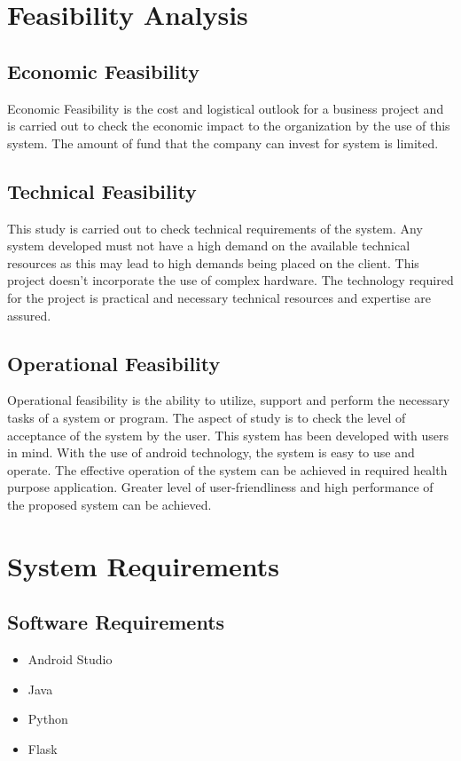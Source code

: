 \section{Feasibility Analysis}\label{sec:fa}%
\subsection{Economic Feasibility}
Economic Feasibility is the cost and logistical outlook for a business project and is carried out to check the economic impact to the organization by the use of this system. The amount of fund that the company can invest for system is limited.

\subsection{Technical Feasibility}
This study is carried out to check technical requirements of the system. Any system developed must not have a high demand on the available technical resources as this may lead to high demands being placed on the client. This project doesn't incorporate the use of complex hardware. The technology required for the project is practical and necessary technical resources and expertise are assured.

\subsection{Operational Feasibility}
Operational feasibility is the ability to utilize, support and perform the necessary tasks of a system or program. The aspect of study is to check the level of acceptance of the system by the user. This system has been developed with users in mind. With the use of android technology, the system is easy to use and operate. The effective operation of the system can be achieved in required health purpose application. Greater level of user-friendliness and high performance of the proposed system can be achieved.

\section{System Requirements}\label{sec:sr}%
\subsection{Software Requirements}
\begin{itemize}
    \item Android Studio
    \item Java
    \item Python
    \item Flask
\end{itemize}

